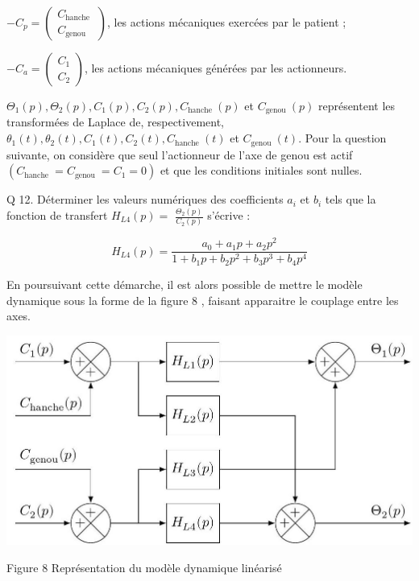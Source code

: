 \documentclass[10pt]{article}
\begin{document}
$-C_{p}=\left(\begin{array}{c}C_{\text {hanche }} \\ C_{\text {genou }}\end{array}\right)$, les actions mécaniques exercées par le patient ;

$-C_{a}=\left(\begin{array}{c}C_{1} \\ C_{2}\end{array}\right)$, les actions mécaniques générées par les actionneurs.

$\Theta_{1}(p), \Theta_{2}(p), C_{1}(p), C_{2}(p), C_{\text {hanche }}(p)$ et $C_{\text {genou }}(p)$ représentent les transformées de Laplace de, respectivement, $\theta_{1}(t), \theta_{2}(t), C_{1}(t), C_{2}(t), C_{\text {hanche }}(t)$ et $C_{\text {genou }}(t)$. Pour la question suivante, on considère que seul l'actionneur de l'axe de genou est actif $\left(C_{\text {hanche }}=C_{\text {genou }}=C_{1}=0\right)$ et que les conditions initiales sont nulles.

Q 12. Déterminer les valeurs numériques des coefficients $a_{i}$ et $b_{i}$ tels que la fonction de transfert $H_{L 4}(p)=$ $\frac{\Theta_{2}(p)}{C_{2}(p)}$ s'écrive :

$$
H_{L 4}(p)=\frac{a_{0}+a_{1} p+a_{2} p^{2}}{1+b_{1} p+b_{2} p^{2}+b_{3} p^{3}+b_{4} p^{4}}
$$

En poursuivant cette démarche, il est alors possible de mettre le modèle dynamique sous la forme de la figure 8 , faisant apparaitre le couplage entre les axes.

\begin{center}
\includegraphics[max width=\textwidth]{2023_05_12_54c6a64d2ffce28d5c72g-06}
\end{center}

Figure 8 Représentation du modèle dynamique linéarisé
\end{document}
